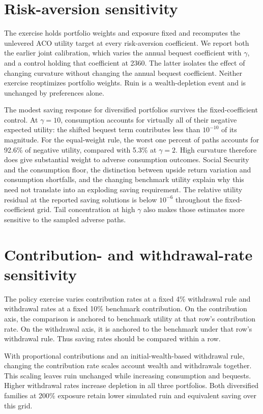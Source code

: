 \section{Risk-aversion sensitivity}
\label{app:gamma-sensitivity}
The exercise holds portfolio weights and exposure fixed and recomputes the
unlevered ACO utility target at every risk-aversion coefficient. We report
both the earlier joint calibration, which varies the annual bequest
coefficient with $\gamma$, and a control holding that coefficient at 2360.
The latter isolates the effect of changing curvature without changing the
annual bequest coefficient. Neither exercise reoptimizes portfolio weights.
Ruin is a wealth-depletion event and is unchanged by preferences alone.



The modest saving response for diversified portfolios survives the
fixed-coefficient control. At $\gamma=10$, consumption accounts for virtually
all of their negative expected utility: the shifted bequest term contributes
less than $10^{-10}$ of its magnitude. For the equal-weight rule, the worst
one percent of paths accounts for 92.6\% of negative utility, compared with
5.3\% at $\gamma=2$. High curvature therefore does give substantial weight
to adverse consumption outcomes. Social Security and the consumption floor,
the distinction between upside return variation and consumption shortfalls,
and the changing benchmark utility explain why this need not translate
into an exploding saving requirement. The relative utility residual at the
reported saving solutions is below $10^{-6}$ throughout the fixed-coefficient
grid. Tail concentration at high $\gamma$ also makes those estimates more
sensitive to the sampled adverse paths.

\section{Contribution- and withdrawal-rate sensitivity}
\label{app:policy-sensitivity}
The policy exercise varies contribution rates at a fixed 4\%
withdrawal rule and withdrawal rates at a fixed 10\% benchmark contribution.
On the contribution axis, the comparison is anchored to benchmark utility
at that row's contribution rate. On the withdrawal axis, it is anchored
to the benchmark under that row's withdrawal rule. Thus saving rates
should be compared within a row.

With proportional contributions and an initial-wealth-based withdrawal
rule, changing the contribution rate scales account wealth and withdrawals
together. This scaling leaves ruin unchanged while increasing consumption and bequests.
Higher withdrawal rates increase depletion in all three portfolios.
Both diversified families at 200\% exposure retain lower simulated ruin
and equivalent saving over this grid.



